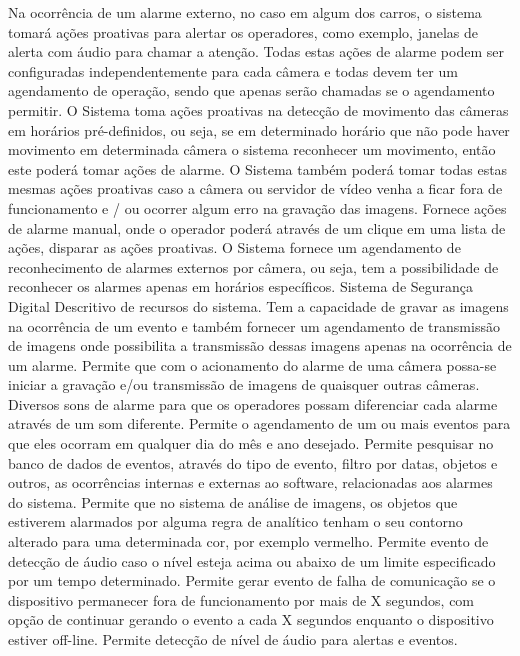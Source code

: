     \bullet Na ocorrência de um alarme externo, no caso em algum dos carros, o sistema tomará ações proativas para alertar os operadores, como exemplo, janelas de alerta com áudio para chamar a atenção.
    \bullet Todas estas ações de alarme podem ser configuradas independentemente para cada câmera e todas devem ter um agendamento de operação, sendo que apenas serão chamadas se o agendamento permitir.
    \bullet O Sistema toma ações proativas na detecção de movimento das câmeras em horários pré-definidos, ou seja, se em determinado horário que não pode haver movimento em determinada câmera o sistema reconhecer um movimento, então este poderá tomar ações de alarme.
    \bullet  O Sistema também poderá tomar todas estas mesmas ações proativas caso a câmera ou servidor de vídeo venha a ficar fora de funcionamento e / ou ocorrer algum erro na gravação das imagens.
    \bullet  Fornece ações de alarme manual, onde o operador poderá através de um clique em uma lista de ações, disparar as ações proativas.
    \bullet O Sistema fornece um agendamento de reconhecimento de alarmes externos por câmera, ou seja, tem a possibilidade de reconhecer os alarmes apenas em horários específicos. Sistema de Segurança Digital Descritivo de recursos do sistema.
    \bullet Tem a capacidade de gravar as imagens na ocorrência de um evento e também fornecer um agendamento de transmissão de imagens onde possibilita a transmissão dessas imagens apenas na ocorrência de um alarme.
    \bullet Permite que com o acionamento do alarme de uma câmera possa-se iniciar a gravação e/ou transmissão de imagens de quaisquer outras câmeras.
    \bullet Diversos sons de alarme para que os operadores possam diferenciar cada alarme através de um som diferente.
    \bullet Permite o agendamento de um ou mais eventos para que eles ocorram em qualquer dia do mês e ano desejado.
    \bullet  Permite pesquisar no banco de dados de eventos, através do tipo de evento, filtro por datas, objetos e outros, as ocorrências internas e externas ao software, relacionadas aos alarmes do sistema.
    \bullet Permite que no sistema de análise de imagens, os objetos que estiverem alarmados por alguma regra de analítico tenham o seu contorno alterado para uma determinada cor, por exemplo vermelho.
    \bullet Permite evento de detecção de áudio caso o nível esteja acima ou abaixo de um limite especificado por um tempo determinado.
    \bullet Permite gerar evento de falha de comunicação se o dispositivo permanecer fora de funcionamento por mais de X segundos, com opção de continuar gerando o evento a cada X segundos enquanto o dispositivo estiver off-line.
    \bullet Permite detecção de nível de áudio para alertas e eventos.
  
